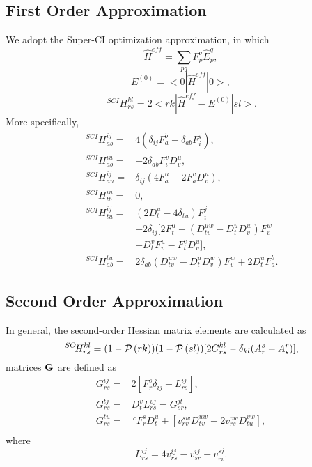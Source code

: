 \documentclass[a4paper,12pt,oneside]{book}
\newcommand{\perm}[1]{{\cal P}\left(#1\right)}
\newcommand{\pre}[1]{\,#1\!}
\begin{document}
\subsection{First Order Approximation}
We adopt the Super-CI optimization approximation\cite{SCI1989}, in which 
\begin{equation}
\hat{H}^{eff}=\sum_{pq}F_p^q \hat{E}_p^q,
\end{equation}
\begin{equation}
E^{(0)}=<0|\hat{H}^{eff}|0>,
\end{equation}
\begin{equation}
\pre{^{SCI}}H_{rs}^{kl}=2<rk|\hat{H}^{eff} - E^{(0)}|sl>.
\end{equation}
More specifically,
\begin{equation}
\begin{aligned}
  \pre{^{SCI}}H_{ab}^{ij} =& 4(\delta_{ij}F_a^b-\delta_{ab}F_i^j),\\
  \pre{^{SCI}}H_{ab}^{iu} =& -2\delta_{ab}F_i^vD_v^u,\\
  \pre{^{SCI}}H_{au}^{ij} =& \delta_{ij}(4F_a^u-2F_a^vD_v^u),\\
  \pre{^{SCI}}H_{tb}^{iu} =& 0,\\
  \pre{^{SCI}}H_{tu}^{ij} =& (2D_t^u-4\delta_{tu}) F_i^j\\
                   &+2\delta_{ij}[2F_t^u-(D_{tv}^{uw}-D_t^uD_v^w)F_v^w\\
                   &-D_t^vF_v^u-F_t^vD_v^u],\\
  \pre{^{SCI}}H_{ab}^{tu} =&2\delta_{ab}(D_{tv}^{uw}-D_t^uD_v^w)F_v^w + 2D_t^uF_a^b.
\end{aligned}
\end{equation}

\subsection{Second Order Approximation}
In general, the second-order Hessian matrix elements are calculated as
\begin{equation}
  \pre{^{SO}}H_{rs}^{kl} = (1-\perm{rk})(1-\perm{sl})[2G^{kl}_{rs}-\delta_{kl}(A_r^s+A_s^r)],
\end{equation}
matrices $\bf{G}$ are defined as
\begin{equation}
\begin{aligned}
G^{ij}_{rs} =& 2[F_r^s\delta_{ij}+L^{ij}_{rs}],\\
G^{tj}_{rs} =& D_t^vL^{vj}_{rs} = G^{jt}_{sr},\\
G^{tu}_{rs} =& \pre{^c}F_r^sD_t^u + [v^{sw}_{rv}D_{tv}^{uw}+2v^{vw}_{rs}D_{tu}^{vw}],\\
\end{aligned}
\end{equation}
where
\begin{equation}
  L^{ij}_{rs} = 4v^{ij}_{rs} - v^{ij}_{sr} - v^{sj}_{ri}.
\end{equation}
\end{document}
